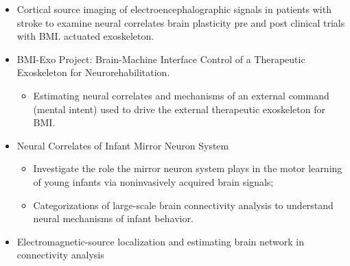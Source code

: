 \documentclass[10pt,letterpaper,sans]{moderncv}   %
\begin{document}
{{\begin{itemize}                         
            \item Cortical source imaging of electroencephalographic signals in patients with stroke to examine neural correlates brain plasticity pre and post clinical trials with BMI. actuated exoskeleton.
        \end{itemize}
}} 


{{\begin{itemize} 
            \item BMI-Exo Project: Brain-Machine Interface Control of a Therapeutic Exoskeleton for Neurorehabilitation.  
            \begin{itemize}
                \item Estimating neural correlates and mechanisms of an external command (mental intent) used to drive the external therapeutic exoskeleton for BMI.
            \end{itemize}
            \vspace{3pt}
            \item Neural Correlates of Infant Mirror Neuron System 
            \begin{itemize}
                \item Investigate the role the mirror neuron system plays in the motor learning of young infants via noninvasively acquired brain signals; 
                \item Categorizations of large-scale brain connectivity analysis to understand neural mechanisms of infant behavior.
            \end{itemize}
            \item Electromagnetic-source localization and estimating brain network in connectivity analysis 
        \end{itemize}
    }}\vspace{10pt}
\end{document}
